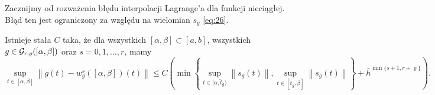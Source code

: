 \documentclass[oik, pdftex, man]{mgrwms}
\begin{document}
    Zacznijmy od rozważenia błędu interpolacji Lagrange'a dla funkcji nieciągłej. Błąd ten jest ograniczony za względu na wielomian $s_{g}$ \eqref{eq:26}.

    \begin{lemma} \label{lem:1:2014}
        Istnieje stała $C$ taka, że dla wszystkich $[\alpha, \beta] \subset [a, b]$, wszystkich $g \in \mathcal{G}_{r,\varrho}([\alpha,\beta])$ oraz $s=0,1,\dots,r$, mamy
        \begin{equation*}
            \sup _{t \in[\alpha, \beta]}\left\|g(t)-w_{g}^{s}([\alpha, \beta])(t)\right\| \leq 
                C\left(\min \left\{\sup_{t \in[\alpha, \hat{t}_{g})}\left\|s_{g}(t)\right\|, \sup _{t \in [\hat{t}_{g}, \beta]}\left\|s_{g}(t)\right\|\right\}+\bar{h}^{\min \{s+1, r+\varrho\}}\right).
        \end{equation*}
    \end{lemma}
\end{document}
